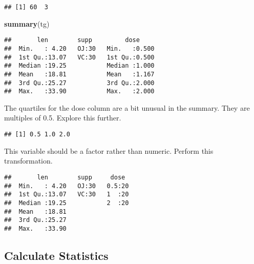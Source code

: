 \documentclass[]{article}
\newenvironment{Shaded}{\begin{snugshade}}{\end{snugshade}}
\newcommand{\KeywordTok}[1]{\textcolor[rgb]{0.13,0.29,0.53}{\textbf{{#1}}}}
\newcommand{\StringTok}[1]{\textcolor[rgb]{0.31,0.60,0.02}{{#1}}}
\newcommand{\NormalTok}[1]{{#1}}
\begin{document}
\begin{verbatim}
## [1] 60  3
\end{verbatim}

\begin{Shaded}
\begin{Highlighting}[]
    \KeywordTok{summary}\NormalTok{(tg)}
\end{Highlighting}
\end{Shaded}

\begin{verbatim}
##       len        supp         dose      
##  Min.   : 4.20   OJ:30   Min.   :0.500  
##  1st Qu.:13.07   VC:30   1st Qu.:0.500  
##  Median :19.25           Median :1.000  
##  Mean   :18.81           Mean   :1.167  
##  3rd Qu.:25.27           3rd Qu.:2.000  
##  Max.   :33.90           Max.   :2.000
\end{verbatim}

The quartiles for the dose column are a bit unusual in the summary. They
are multiples of 0.5. Explore this further.

\begin{Shaded}
\end{Shaded}

\begin{verbatim}
## [1] 0.5 1.0 2.0
\end{verbatim}

This variable should be a factor rather than numeric. Perform this
transformation.

\begin{Shaded}
\end{Shaded}

\begin{verbatim}
##       len        supp     dose   
##  Min.   : 4.20   OJ:30   0.5:20  
##  1st Qu.:13.07   VC:30   1  :20  
##  Median :19.25           2  :20  
##  Mean   :18.81                   
##  3rd Qu.:25.27                   
##  Max.   :33.90
\end{verbatim}

\subsection{Calculate Statistics}\label{calculate-statistics}
\end{document}
